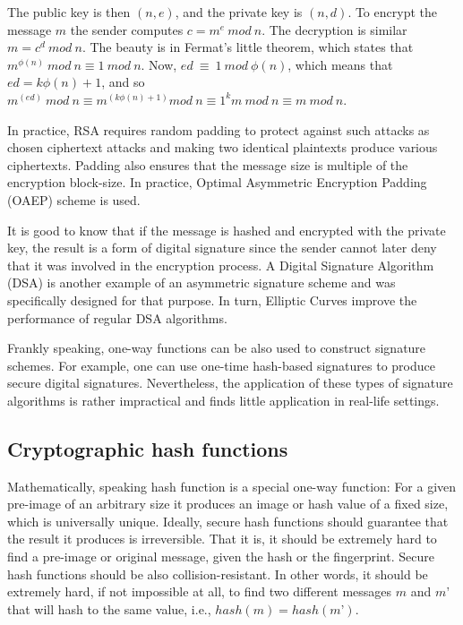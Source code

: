 The public key is then $(n, e)$, and the private key is $(n, d)$. To encrypt the message $m$ 
the sender computes $c= m^e\ mod\ n$. The decryption is similar $m = c^d\ mod\ n$. The beauty is 
in Fermat’s little theorem, which states that $m^{\phi(n)}\ mod\ n \equiv 1\ mod\ n$. 
Now, $ed\ \equiv\ 1\ mod\ \phi(n)$, which means that 
$ed=k\phi(n)+1$, and so $m^{(ed)}\ mod\ n \equiv m^{(k\phi(n)+1)} mod\ n \equiv 1^k m\ mod\ n \equiv m\ mod\ n$. 

In practice, RSA requires random padding to protect against such attacks as chosen ciphertext 
attacks and making two identical plaintexts produce various ciphertexts. Padding also ensures that the 
message size is multiple of the encryption block-size. In practice, Optimal Asymmetric Encryption Padding (OAEP) 
scheme is used.

It is good to know that if the message is hashed and encrypted with the private key, the result is a 
form of digital signature since the sender cannot later deny that it was involved in the encryption 
process. A Digital Signature Algorithm (DSA) is another example of an asymmetric signature scheme and 
was specifically designed for that purpose. In turn, Elliptic Curves improve the performance of regular DSA 
algorithms.

Frankly speaking, one-way functions can be also used to construct signature schemes. 
For example, one can use one-time hash-based signatures to produce secure digital signatures. Nevertheless, 
the application of these types of signature algorithms is rather impractical and finds 
little application in real-life settings.

\subsection{Cryptographic hash functions}

Mathematically, speaking hash function is a special one-way function: For a given  
pre-image of an arbitrary size it produces an image or hash value of a fixed size, 
which is universally unique. Ideally, secure hash functions should guarantee 
that the result it produces is irreversible. That it is, it 
should be extremely hard to find a pre-image or original message, given the 
hash or the fingerprint. Secure hash functions should be also collision-resistant. 
In other words, it should be extremely hard, if not impossible at all, to 
find two different messages $m$ and $m’$ that will hash to the same value, i.e., 
$hash(m)=hash(m’)$.

